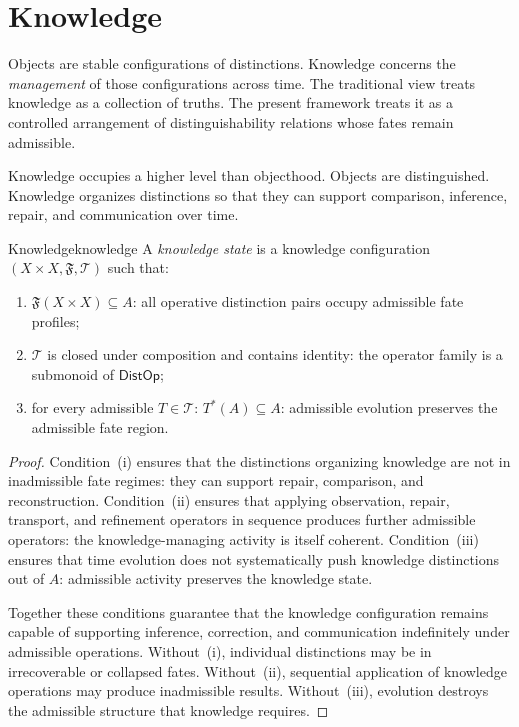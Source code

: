 \documentclass[12pt,twoside,openright]{book}
\newcommand{\transfam}{\mathcal{T}}       %
\newcommand{\fateMap}{\mathfrak{F}}
\newcommand{\distOp}{\mathsf{DistOp}}
\newcommand{\admRegion}{A}
\providecommand{\admRegion}{A}
\begin{document}
\section{Knowledge}

Objects are stable configurations of distinctions. Knowledge
concerns the \emph{management} of those configurations across
time. The traditional view treats knowledge as a collection of
truths. The present framework treats it as a controlled
arrangement of distinguishability relations whose fates remain
admissible.

Knowledge occupies a higher level than objecthood. Objects are
distinguished. Knowledge organizes distinctions so that they
can support comparison, inference, repair, and communication
over time.

\begin{theorem}{Knowledge}{knowledge}
A \emph{knowledge state} is a knowledge configuration
$(X\times X, \fateMap, \transfam)$ such that:
\begin{enumerate}[nosep,label=(\roman*)]
  \item $\fateMap(X\times X)\subseteq\admRegion$: all
    operative distinction pairs occupy admissible fate profiles;
  \item $\transfam$ is closed under composition and contains
    identity: the operator family is a submonoid of $\distOp$;
  \item for every admissible $T\in\transfam$:
    $T^*(\admRegion)\subseteq\admRegion$: admissible evolution
    preserves the admissible fate region.
\end{enumerate}
\begin{proof}
Condition~(i) ensures that the distinctions organizing
knowledge are not in inadmissible fate regimes: they can
support repair, comparison, and reconstruction.
Condition~(ii) ensures that applying observation, repair,
transport, and refinement operators in sequence produces
further admissible operators: the knowledge-managing activity
is itself coherent.
Condition~(iii) ensures that time evolution does not
systematically push knowledge distinctions out of $\admRegion$:
admissible activity preserves the knowledge state.

Together these conditions guarantee that the knowledge
configuration remains capable of supporting inference,
correction, and communication indefinitely under admissible
operations. Without~(i), individual distinctions may be in
irrecoverable or collapsed fates. Without~(ii), sequential
application of knowledge operations may produce inadmissible
results. Without~(iii), evolution destroys the admissible
structure that knowledge requires.
\end{proof}
\end{theorem}
\end{document}

